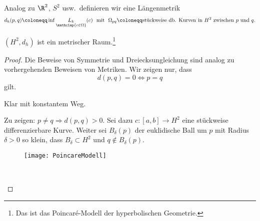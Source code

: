\begin{definition}
  Analog zu \( \R^2 \), \( S^2 \) usw.\ definieren wir eine Längenmetrik
  \begin{equation*}
    d_h(p,q) \coloneqq \inf \underset{\mathclap{c \in \Omega}}{L_k}(c) \ \text{ mit } \ \Omega_{pq} \coloneqq \text{stückweise db. Kurven in \( H^2 \) zwischen \( p \) und \( q \).}
  \end{equation*}
\end{definition}

\begin{theorem}
  \( (H^2, d_h) \) ist ein metrischer Raum.\footnote{Das ist das Poincaré-Modell der hyperbolischen Geometrie.}

  \begin{proof}
    Die Beweise von Symmetrie und Dreiecksungleichung sind analog zu vorhergehenden Beweisen von Metriken. Wir zeigen nur, dass
    \begin{equation*}
      d(p,q) = 0 \Leftrightarrow p = q
    \end{equation*}
    gilt.
    \begin{itemize}
      \item[\( \Leftarrow \)] Klar mit konstantem Weg.

      \begin{minipage}{.6\textwidth}
        \vspace{1em}
        \item[\( \Rightarrow \)] Zu zeigen: \( p \neq q \Rightarrow d(p,q) > 0 \). Sei dazu \( c:[a,b] \to H^2 \) eine stückweise differenzierbare Kurve. Weiter sei \( B_\delta(p) \) der euklidische Ball um \( p \) mit Radius \( \delta > 0 \) so klein, dass \( B_\delta \subset H^2 \) und \( q \not \in B_\delta(p) \).        
      \end{minipage}
      \hfill
      \begin{minipage}{.375\textwidth}
        \begin{figure}[H]
          \texttt{[image: PoincareModell]}
        \end{figure}
      \end{minipage}
      \  \\


\end{itemize}
\end{proof}
\end{theorem}

